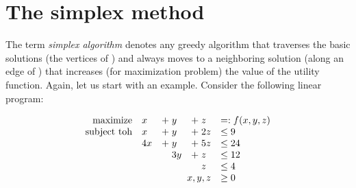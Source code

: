 \section{The simplex method}
\renewcommand{\common}{
      \draw[dashed]
        (0,0,0) -- (6,0,0)
        (0,0,0) -- (0,4,0)
        (0,0,0) -- (0,0,4);
    
    \draw
      (1,0,4) -- (5,4,0) -- (0,3,3) -- (0,1,4) -- (1,0,4) -- (0,0,4) -- (0,1,4)
      (1,0,4) -- (6,0,0) -- (5,4,0) -- (0,4,0) -- (0,3,3);


}

\newcommand{\tmpSimplexNode}[2]{
  (#1) circle (1.2pt) node[anchor=#2] {\footnotesize $(#1)$}
}

\noindent
The term {\em simplex algorithm} denotes any greedy algorithm that
traverses the basic solutions (the vertices of \dom) and always moves to
a neighboring solution (along an edge of \dom) that increases (for maximization
problem) the value of the utility function. Again, let us start with an example.
Consider the following linear program:


\begin{equation}
  \label{simplex:eq:1}
  \begin{array}{rllll}
    \text{maximize}& x & +\;y & +\;z & =:  f(x,y,z)\\
  \text{subject toh}& x & +\;y & +\;2z & \le 9\\
                         & 4x & +\;y&+\;5z&\le 24\\
                         &    &\phantom{+}\;3y&+\;z&\le 12\\
                         &    &     &\phantom{+}\;z&\le 4\\
\multicolumn{4}{r}{x,y,z}&\ge 0
 

  \end{array}
\end{equation}


